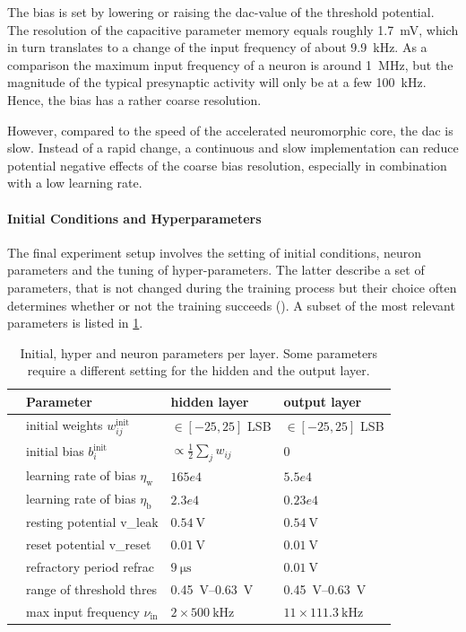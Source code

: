 The bias is set by lowering or raising the \gls{dac}-value of the threshold potential. The resolution of the capacitive parameter memory equals roughly \SI{1.7}{\milli \V}, which in turn translates to a change of the input frequency of about \SI{9.9}{\kilo \Hz}. As a comparison the maximum input frequency of a neuron is around \SI{1}{\mega \Hz}, but the magnitude of the typical presynaptic activity will only be at a few \SI{100}{\kilo \Hz}. Hence, the bias has a rather coarse resolution.

However, compared to the speed of the accelerated neuromorphic core, the \acrlong{dac} is slow. Instead of a rapid change, a continuous and slow implementation can reduce potential negative effects of the coarse bias resolution, especially in combination with a low learning rate.

\paragraph{Initial Conditions and Hyperparameters}
The final experiment setup involves the setting of initial conditions, neuron parameters and the tuning of hyper-parameters. The latter describe a set of parameters, that is not changed during the training process but their choice often determines whether or not the training succeeds (\citealp{Goodfellow-et-al-2016}). A subset of the most relevant parameters is listed in \cref{circlesinitparameters}.

\begin{table}[t!]\centering{}
	\begin{tabular}{@{}rlll@{}}\toprule
		& Parameter								& 	hidden layer 			& 	output layer 	\\ \midrule
		& initial weights $w_{ij}^\text{init}$	& 	 $\in[-25, 25]$	LSB		&	$\in[-25, 25]$ LSB	\\
		& initial bias $b_{i}^\text{init}$		& $\propto \frac{1}{2} \sum_j w_{ij}$ &	0		\\
		& learning rate of bias  $\eta_\text{w}$&	$165e4$					& 	$5.5e4$			\\
		& learning rate of bias  $\eta_\text{b}$&	$2.3e4$					& 	$0.23e4$		\\
		& resting potential \gls{v_leak}		&	$\SI{0.54}{\V}$ 		& 	$\SI{0.54}{\V}$	\\
		& reset potential \gls{v_reset}			&	$\SI{0.01}{\V}$			& 	$\SI{0.01}{\V}$	\\
		& refractory period \gls{refrac}		&	$\SI{9}{\micro \s}$			& 	$\SI{0.01}{\V}$	\\
		& range of threshold \gls{thres} 				&	\SIrange{0.45}{0.63}{\V}&	\SIrange{0.45}{0.63}{\V}\\
		& max input frequency $\nu_{\text{in}}$	&	$2 \times \SI{500}{\kilo \Hz}$	& $11 \times \SI{111.3}{\kilo\Hz}$	\\
		\bottomrule
	\end{tabular}
	\caption[Initial, hyper and neuron parameters per layer.]{Initial, hyper and neuron parameters per layer. Some parameters require a different setting for the hidden and the output layer.}
	\label{circlesinitparameters}
\end{table}

